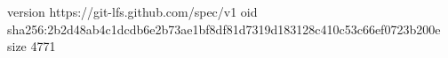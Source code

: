 version https://git-lfs.github.com/spec/v1
oid sha256:2b2d48ab4c1dcdb6e2b73ae1bf8df81d7319d183128c410c53c66ef0723b200e
size 4771
